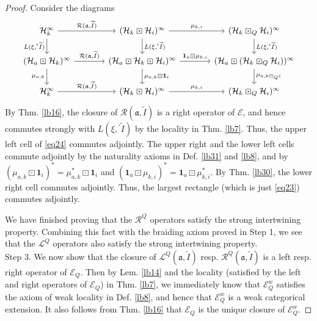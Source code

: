\documentclass[11pt,b5paper,notitlepage]{article}
\theoremstyle{definition}
\theoremstyle{plain}
\newcommand{\fk}{\mathfrak}
\newcommand{\mc}{\mathcal}
\newcommand{\wtd}{\widetilde}
\newcommand{\idt}{\mathbf{1}}
\newcommand{\scr}{\mathscr}
\newcommand{\bpr}{{}^\backprime}
\numberwithin{equation}{section}
\begin{document}
\begin{proof}
Consider the diagrams
\begin{equation}\label{eq24}
\begin{tikzcd}[column sep=large]
\mc H_k^\infty \arrow[r,"{\mc R(\fk a,\wtd I)}"] \arrow[d,"{L(\xi,\bpr\wtd I)}"'] & (\mc H_k\boxdot\mc H_i)^\infty \arrow[r,"\mu_{k,i}"] \arrow[d,"{L(\xi,\bpr\wtd I)}"] & (\mc H_k\boxdot_Q\mc H_i)^\infty \arrow[d,"{L(\xi,\bpr\wtd I)}"] \\
(\mc H_a\boxdot\mc H_k)^\infty \arrow[r,"{\mc R(\fk a,\wtd I)}"] \arrow[d,"\mu_{a,k}"'] & (\mc H_a\boxdot\mc H_k\boxdot\mc H_i)^\infty \arrow[r,"\idt_a\boxdot\mu_{k,i}"] \arrow[d,"\mu_{a,k}\boxdot\idt_i"] & (\mc H_a\boxdot(\mc H_k\boxdot_Q\mc H_i))^\infty \arrow[d,"{\mu_{a,k\boxdot_Q i}}"] \\
\mc H_k^\infty \arrow[r,"{\mc R(\fk a,\wtd I)}"]           & (\mc H_k\boxdot\mc H_i)^\infty \arrow[r,"\mu_{k,i}"]           & (\mc H_k\boxdot_Q\mc H_i)^\infty          
\end{tikzcd}
\end{equation}
By Thm. \ref{lb16}, the closure of $\mc R(\fk a,\wtd I)$ is a right operator of $\scr E$, and hence commutes strongly with $L(\xi,\bpr\wtd I)$ by the locality in Thm. \ref{lb7}. Thus, the upper left cell of \eqref{eq24} commutes adjointly. The upper right and the lower left cells commute adjointly by the naturality axioms in Def. \ref{lb31} and \ref{lb8}, and by $(\mu_{a,k}\boxdot\idt_i)^*=\mu_{a,k}^*\boxdot\idt_i$ and $(\idt_a\boxdot\mu_{k,i})^*=\idt_a\boxdot\mu_{k,i}^*$. By Thm. \ref{lb30}, the lower right cell commutes adjointly. Thus, the largest rectangle (which is just \eqref{eq23}) commutes adjointly.

We have finished proving that the $\mc R^Q$ operators satisfy the strong intertwining property. Combining this fact with the braiding axiom proved in Step 1, we see that the $\mc L^Q$ operators also satisfy the strong intertwining property. \\[-1ex]



Step 3. We now show that the closure of $\mc L^Q(\fk a,\wtd I)$ resp. $\mc R^Q(\fk a,\wtd I)$ is a left resp. right operator of $\scr E_Q$. Then by Lem. \ref{lb14} and the locality (satisfied by the left and right operators of $\scr E_Q$) in Thm. \ref{lb7}, we immediately know that $\scr E_Q^w$ satisfies the axiom of weak locality in Def. \ref{lb8}, and hence that $\scr E_Q^w$ is a weak categorical extension. It also follows from Thm. \ref{lb16} that $\scr E_Q$ is the unique closure of $\scr E_Q^w$.


\end{proof}
\end{document}
